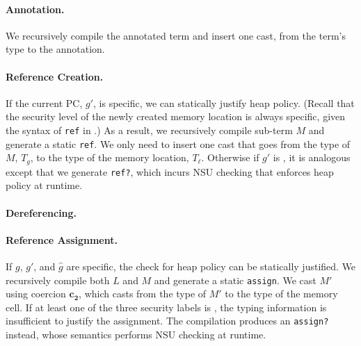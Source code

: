 \paragraph{Annotation.}
We recursively compile the annotated term and insert one cast, from the term's
type to the annotation.

\paragraph{Reference Creation.}
If the current PC, $g'$, is specific, we can statically justify heap policy.
(Recall that the security level of the newly created memory location is always
specific, given the syntax of \texttt{ref} in \Surface.) As a result, we
recursively compile sub-term $M$ and generate a static \texttt{ref}. We only
need to insert one cast that goes from the type of $M$, $T_g$, to the type of
the memory location, $T_{\ell}$. Otherwise if $g'$ is \unk, it is analogous
except that we generate \texttt{ref?}, which incurs NSU checking that enforces
heap policy at runtime.

\paragraph{Dereferencing.}

\paragraph{Reference Assignment.} If $g$, $g'$, and $\hat{g}$ are
specific, the check for heap policy can be statically justified. We recursively
compile both $L$ and $M$ and generate a static \texttt{assign}. We cast $M'$
using coercion $\bm{c_2}$, which casts from the type of $M'$ to the type of the
memory cell. If at least one of the three security labels is \unk, the typing
information is insufficient to justify the assignment. The compilation produces
an \texttt{assign?} instead, whose semantics performs NSU checking at runtime.
